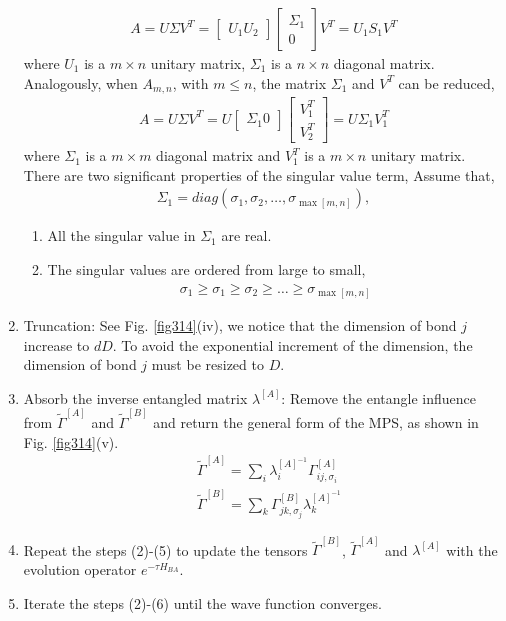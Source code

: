 \begin{enumerate}
\begin{align}
	A = U \Sigma V^T = \begin{bmatrix} U_1 U_2 \end{bmatrix} \begin{bmatrix} \Sigma_1 \\ 0 \end{bmatrix} V^T = U_1 S_1 V^T
\end{align}
where $U_1$ is a $m \times n$ unitary matrix, $\Sigma_1$ is a $n \times n$ diagonal matrix. Analogously, when $A_{m,n}$, with $m \leq n$, the matrix $\Sigma_1$ and $V^T$ can be reduced,
\begin{align}
	A = U \Sigma V^T = U \begin{bmatrix} \Sigma_1 0 \end{bmatrix} \begin{bmatrix} V_1^T \\ V_2^T \end{bmatrix} = U \Sigma_1 V_1^T
\end{align}
where $\Sigma_1$ is a $m \times m$ diagonal matrix and $V_1^T$ is a $m \times n$ unitary matrix. There are two significant properties of the singular value term, Assume that,
\begin{align}
\Sigma_1 = diag \left(\sigma_1, \sigma_2, \dots, \sigma_{\max{[m,n]}} \right), 
\end{align}
\begin{enumerate}
	\item All the singular value in $\Sigma_1$ are real.
	\item The singular values are ordered from large to small,
		\begin{align}
			\sigma_1 \geq \sigma_1 \geq \sigma_2 \geq \dots \geq \sigma_{\max{[m,n]}}
		\end{align}
\end{enumerate}
		\item Truncation: See Fig. \ref{fig314}(iv), we notice that the dimension of bond $j$ increase to $dD$. To avoid the exponential increment of the dimension, the dimension of bond $j$ must be resized to $D$.
		\item Absorb the inverse entangled matrix $\lambda^{[A]}$: Remove the entangle influence from $\widetilde{\Gamma}^{[A]}$ and $\widetilde{\Gamma}^{[B]}$ and return the general form of the MPS, as shown in Fig. \ref{fig314}(v).
			\begin{align}
				&\widetilde{\Gamma}^{[A]} = \sum_{i}{ \lambda_{i}^{[A]^{-1}} \Gamma^{[A]}_{ij,\sigma_i}} \\
				&\widetilde{\Gamma}^{[B]} = \sum_{k}{\Gamma^{[B]}_{jk,\sigma_j} \lambda_{k}^{[A]^{-1}}}
			\end{align}
		\item Repeat the steps (2)-(5) to update the tensors $\widetilde{\Gamma}^{[B]}$, $\widetilde{\Gamma}^{[A]}$ and $\lambda^{[A]}$ with the evolution operator $e^{-\tau H_{BA}}$.
		\item Iterate the steps (2)-(6) until the wave function converges.
\end{enumerate}

